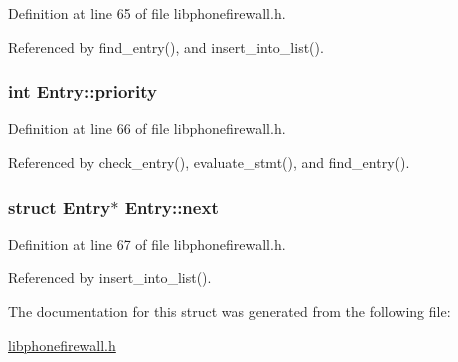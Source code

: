 Definition at line 65 of file libphonefirewall.h.

Referenced by find\_\-entry(), and insert\_\-into\_\-list().\hypertarget{structEntry_85af261b3171c257892b54a7200da061}{
\subsubsection{\setlength{\rightskip}{0pt plus 5cm}int {\bf Entry::priority}}}
\label{structEntry_85af261b3171c257892b54a7200da061}




Definition at line 66 of file libphonefirewall.h.

Referenced by check\_\-entry(), evaluate\_\-stmt(), and find\_\-entry().\hypertarget{structEntry_08cba741f383cd7da0f3ab9aee6e3cd5}{
\subsubsection{\setlength{\rightskip}{0pt plus 5cm}struct {\bf Entry}$\ast$ {\bf Entry::next}}}
\label{structEntry_08cba741f383cd7da0f3ab9aee6e3cd5}




Definition at line 67 of file libphonefirewall.h.

Referenced by insert\_\-into\_\-list().

The documentation for this struct was generated from the following file:\begin{CompactItemize}
\item 
\hyperlink{libphonefirewall_8h}{libphonefirewall.h}\end{CompactItemize}
